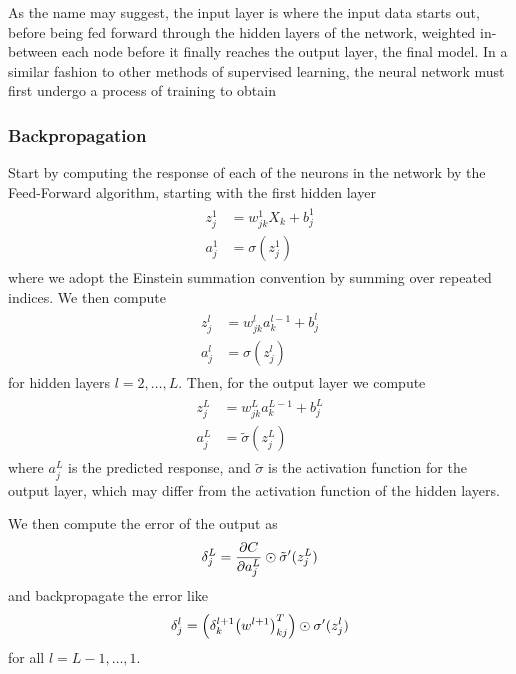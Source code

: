 \documentclass[reprint, english, nofootinbib]{revtex4-2}
\begin{document}
As the name may suggest, the input layer is where the input data starts out, before being fed forward through the hidden layers of the network, weighted in-between each node before it finally reaches the output layer, the final model. In a similar fashion to other methods of supervised learning, the neural network must first undergo a process of training to obtain

\subsubsection{Backpropagation}
\noindent
Start by computing the response of each of the neurons in the network by the Feed-Forward algorithm, starting with the first hidden layer
\begin{align}\label{eqn: FeedForward Initial}
    \begin{split}
        z^1_j &= w^1_{jk}X_k + b^1_j \\
        a^1_j &= \sigma(z^1_j)
    \end{split}
\end{align}
where we adopt the Einstein summation convention by summing over repeated indices.
We then compute
\begin{align}
    \begin{split}
        z^l_{j} &= w^l_{jk}a^{l-1}_k + b^l_j \\
        a^l_{j} &= \sigma(z^l_{j})
    \end{split}
\end{align}
for hidden layers $l = 2, \dots, L$. Then, for the output layer we compute
\begin{align}
    \begin{split}
        z^{L}_j &= w^{L}_{jk}a^{L-1}_k + b^{L}_j \\
        a^{L}_j &= \tilde\sigma(z^{L}_j)
    \end{split}
\end{align}
where $a^{L}_j$ is the predicted response, and $\tilde\sigma$ is the activation function for the output layer, which may differ from the activation function of the hidden layers.

We then compute the error of the output as
\begin{equation}
    \delta^{L}_j = \pdv{C}{a^{L}_{j}} \odot \tilde\sigma'(z^{L}_j)
\end{equation}
and backpropagate the error like
\begin{equation}
    \delta^{l}_j = \qty(\delta^{l+1}_{k}\qty(w^{l+1})^T_{kj}) \odot \sigma'(z^l_j)
\end{equation}
for all $l = L-1, \dots, 1$.
\end{document}
